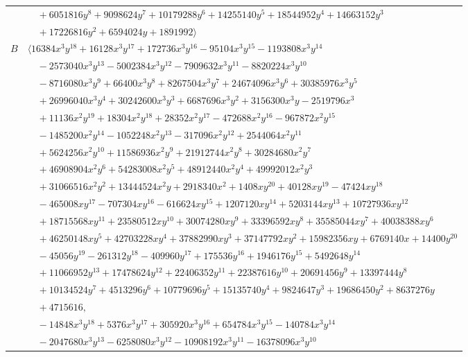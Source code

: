\documentclass[11pt]{article}
\begin{document}
\begin{longtable}{@{}ll@{}}
 & $\quad +6051816y^{8}+9098624y^{7}+10179288y^{6}+14255140y^{5}+18544952y^{4}+14663152y^{3}$\\
 & $\quad +17226816y^{2}+6594024y+1891992\rangle$\\
$B$ & $\langle 16384x^{3}y^{18}+16128x^{3}y^{17}+172736x^{3}y^{16}-95104x^{3}y^{15}-1193808x^{3}y^{14}$\\
 & $\quad -2573040x^{3}y^{13}-5002384x^{3}y^{12}-7909632x^{3}y^{11}-8820224x^{3}y^{10}$\\
 & $\quad -8716080x^{3}y^{9}+66400x^{3}y^{8}+8267504x^{3}y^{7}+24674096x^{3}y^{6}+30385976x^{3}y^{5}$\\
 & $\quad +26996040x^{3}y^{4}+30242600x^{3}y^{3}+6687696x^{3}y^{2}+3156300x^{3}y-2519796x^{3}$\\
 & $\quad +11136x^{2}y^{19}+18304x^{2}y^{18}+28352x^{2}y^{17}-472688x^{2}y^{16}-967872x^{2}y^{15}$\\
 & $\quad -1485200x^{2}y^{14}-1052248x^{2}y^{13}-317096x^{2}y^{12}+2544064x^{2}y^{11}$\\
 & $\quad +5624256x^{2}y^{10}+11586936x^{2}y^{9}+21912744x^{2}y^{8}+30284680x^{2}y^{7}$\\
 & $\quad +46908904x^{2}y^{6}+54283008x^{2}y^{5}+48912440x^{2}y^{4}+49992012x^{2}y^{3}$\\
 & $\quad +31066516x^{2}y^{2}+13444524x^{2}y+2918340x^{2}+1408xy^{20}+40128xy^{19}-47424xy^{18}$\\
 & $\quad -465008xy^{17}-707304xy^{16}-616624xy^{15}+1207120xy^{14}+5203144xy^{13}+10727936xy^{12}$\\
 & $\quad +18715568xy^{11}+23580512xy^{10}+30074280xy^{9}+33396592xy^{8}+35585044xy^{7}+40038388xy^{6}$\\
 & $\quad +46250148xy^{5}+42703228xy^{4}+37882990xy^{3}+37147792xy^{2}+15982356xy+6769140x+14400y^{20}$\\
 & $\quad -45056y^{19}-261312y^{18}-409960y^{17}+175536y^{16}+1946176y^{15}+5492648y^{14}$\\
 & $\quad +11066952y^{13}+17478624y^{12}+22406352y^{11}+22387616y^{10}+20691456y^{9}+13397444y^{8}$\\
 & $\quad +10134524y^{7}+4513296y^{6}+10779696y^{5}+15135740y^{4}+9824647y^{3}+19686450y^{2}+8637276y$\\
 & $\quad +4715616,$\\
 & $\quad -14848x^{3}y^{18}+5376x^{3}y^{17}+305920x^{3}y^{16}+654784x^{3}y^{15}-140784x^{3}y^{14}$\\
 & $\quad -2047680x^{3}y^{13}-6258080x^{3}y^{12}-10908192x^{3}y^{11}-16378096x^{3}y^{10}$\\

\end{longtable}
\end{document}
